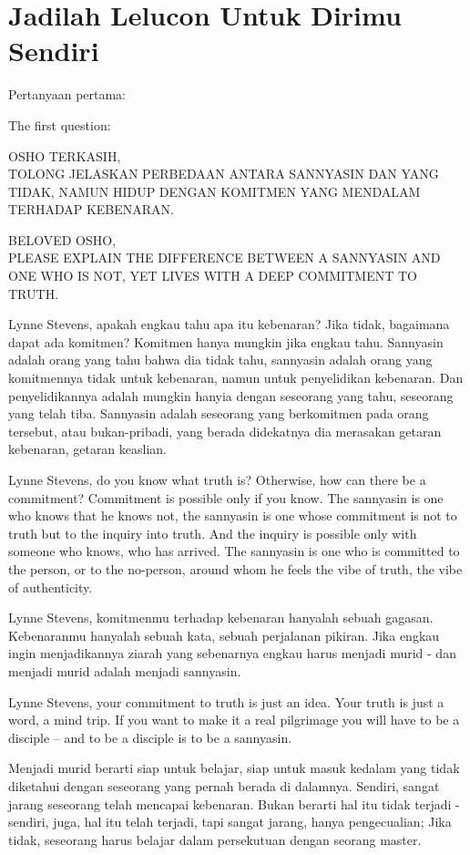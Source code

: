 \chapter{Jadilah Lelucon Untuk Dirimu Sendiri} %

\bahasa
Pertanyaan pertama:

\english
The first question:

\bahasa
OSHO TERKASIH,\\
TOLONG JELASKAN PERBEDAAN ANTARA SANNYASIN DAN YANG TIDAK, NAMUN HIDUP DENGAN KOMITMEN YANG MENDALAM TERHADAP KEBENARAN.

\english
BELOVED OSHO,\\
PLEASE EXPLAIN THE DIFFERENCE BETWEEN A SANNYASIN AND ONE WHO IS NOT, YET LIVES WITH A DEEP COMMITMENT TO TRUTH.

\bahasa
Lynne Stevens, apakah engkau tahu apa itu kebenaran? Jika tidak, bagaimana dapat ada komitmen? Komitmen hanya mungkin jika engkau tahu. Sannyasin adalah orang yang tahu bahwa dia tidak tahu, sannyasin adalah orang yang komitmennya tidak untuk kebenaran, namun untuk penyelidikan kebenaran. Dan penyelidikannya adalah mungkin hanyia dengan seseorang yang tahu, seseorang yang telah tiba. Sannyasin adalah seseorang yang berkomitmen pada orang tersebut, atau bukan-pribadi, yang berada didekatnya dia merasakan getaran kebenaran, getaran keaslian.

\english
Lynne Stevens, do you know what truth is? Otherwise, how can there be a commitment? Commitment is possible only if you know. The sannyasin is one who knows that he knows not, the sannyasin is one whose commitment is not to truth but to the inquiry into truth. And the inquiry is possible only with someone who knows, who has arrived. The sannyasin is one who is committed to the person, or to the no-person, around whom he feels the vibe of truth, the vibe of authenticity.

\bahasa
Lynne Stevens, komitmenmu terhadap kebenaran hanyalah sebuah gagasan. Kebenaranmu hanyalah sebuah kata, sebuah perjalanan pikiran. Jika engkau ingin menjadikannya ziarah yang sebenarnya engkau harus menjadi murid - dan menjadi murid adalah menjadi sannyasin.

\english
Lynne Stevens, your commitment to truth is just an idea. Your truth is just a word, a mind trip. If you want to make it a real pilgrimage you will have to be a disciple -- and to be a disciple is to be a sannyasin.

\bahasa
Menjadi murid berarti siap untuk belajar, siap untuk masuk kedalam yang tidak diketahui dengan seseorang yang pernah berada di dalamnya. Sendiri, sangat jarang seseorang telah mencapai kebenaran. Bukan berarti hal itu tidak terjadi - sendiri, juga, hal itu telah terjadi, tapi sangat jarang, hanya pengecualian; Jika tidak, seseorang harus belajar dalam persekutuan dengan seorang master.

